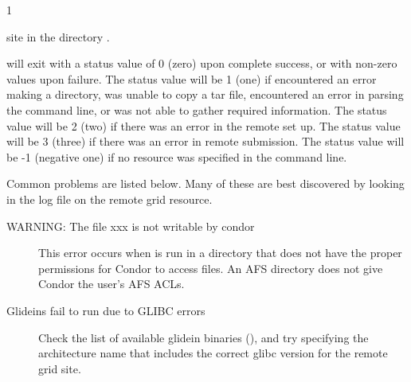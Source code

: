 \begin{ManPage}{\label{man-condor-glidein}}{1}
\begin{Options}
{        site in the directory . }
\end{Options}

\ExitStatus

 will exit with a status value of 0 (zero) upon 
complete success,
or with non-zero values upon failure.
The status value will be 1 (one) if 
 encountered an error making a directory,
was unable to copy a tar file,
encountered an error in parsing the command line,
or was not able to gather required information.
The status value will be 2 (two) if 
there was an error in the remote set up.
The status value will be 3 (three) if 
there was an error in remote submission.
The status value will be -1 (negative one) if 
no resource was specified in the command line.

Common problems are listed below.  Many of these are best discovered by
looking in the  log file on the remote grid resource.

\begin{description}

\item[WARNING: The file xxx is not writable by condor]
This error occurs when
 is run in a directory that does not have the proper
permissions for Condor to access files.  An AFS directory
does not give Condor the user's AFS ACLs.

\item[Glideins fail to run due to GLIBC errors] Check the list of
available glidein binaries
(), and try 
specifying the architecture name that includes the correct glibc
version for the remote grid site.


\end{description}
\end{ManPage}
